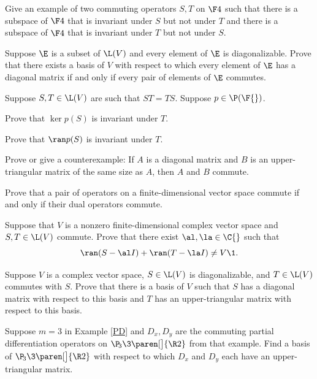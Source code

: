 
\exercise
Give an example of two commuting operators $S, T$ on $\F4$ such that there is a subspace of $\F4$ that is invariant under $S$ but not under $T$ and there is a subspace of $\F4$ that is invariant under $T$ but not under $S$.


\exercise
Suppose $\E$ is a subset of $\L(V)$ and every element of $\E$ is diagonalizable. Prove that there exists a basis of $V$ with respect to which every element of $\E$ has a diagonal matrix if and only if every pair of elements of $\E$ commutes.%
 \label{3Diag}


\exercise
Suppose $S, T \in \L(V)$ are such that $ST = TS$. Suppose $p \in \P(\F{})$.
\begin{subtheorem}
\item
Prove that $\ker p(S)$ is invariant under $T$.
\item
Prove that $\ran p(S)$ is invariant under $T$.
\end{subtheorem}


\exercise
Prove or give a counterexample: If $A$ is a diagonal matrix and $B$ is an upper-triangular matrix of the same size as $A$, then $A$ and $B$ commute.


\exercise
Prove that a pair of operators on a finite-dimensional vector space commute if and only if their dual operators commute.
\label{5dualcom}


\exercise
Suppose that $V$ is a nonzero finite-dimensional complex vector space and $S, T \in \L(V)$ commute. Prove that there exist $\al, \la \in \C{}$ such that
\[
\ran (S - \al I) + \ran (T - \la I) \ne V\1.
\]
\exercisedisplayend


\exercise
Suppose $V$ is a complex vector space, $S \in \L(V)$ is diagonalizable, and $T \in \L(V)$ commutes with $S$. Prove that there is a basis of $V$ such that $S$ has a diagonal matrix with respect to this basis and $T$ has an upper-triangular matrix with respect to this basis.


\exercise
Suppose $m = 3$ in Example \ref{PD} and $D_x, D_y$ are the commuting partial differentiation operators on $\P\!_3\3\paren[\big]{\R2}$ from that example. Find a basis of $\P\!_3\3\paren[\big]{\R2}$ with respect to which $D_x$ and $D_y$ each have an upper-triangular matrix.



